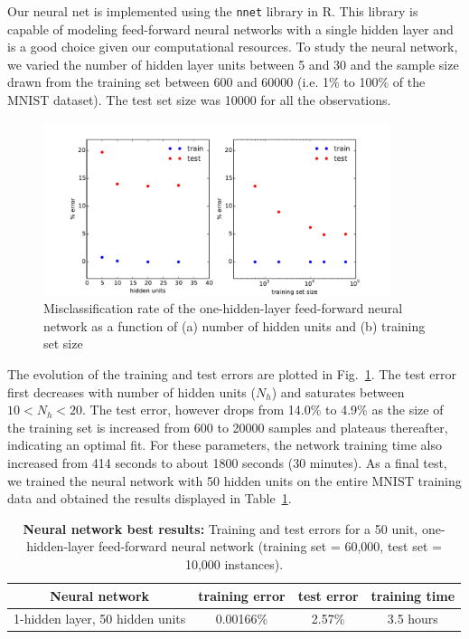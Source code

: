 \documentclass[10pt,letterpaper]{article}
\begin{document}
Our neural net is implemented using the {\tt nnet} library in R. This library is capable of modeling feed-forward neural networks with a single
hidden layer and is a good choice given our computational resources. To study the neural network, we varied the number of hidden layer units between 5 and 30 and the sample size drawn from the training set between 600 and 60000 (i.e. 1\% to 100\% of the MNIST dataset). The test set size was 10000 for all the observations.  
\begin{figure}[!tbp]
	\begin{center}
	\includegraphics[width=4in]{../results/mnist/nnet/error_vs_hidden_units_and_training_size.pdf}
	\end{center}
	\caption{Misclassification rate of the one-hidden-layer feed-forward neural network as a function of (a) number of hidden units and (b) training set size \label{nnet1}}
\end{figure}

The evolution of the training and test errors are plotted in Fig.~\ref{nnet1}. The test error first decreases with number of hidden units ($N_h$) and saturates between $10 < N_h < 20$. The test error, however drops from 14.0\% to 4.9\% as the size of the training set is increased from 600 to 20000 samples and plateaus thereafter, indicating an optimal fit. For these parameters, the network training time also increased from 414 seconds to about 1800 seconds (30 minutes). As a final test, we trained the neural network with 50 hidden units on the entire MNIST training data and obtained the results displayed in Table~\ref{tab2}.  
\begin{table}[tbp]
	\caption{{\bf Neural network best results:} Training and test errors for a 50 unit, one-hidden-layer feed-forward neural network (training set = 60,000, test set = 10,000 instances).\label{tab2}}
	\centering
    \begin{tabular}{c|c|c|c}
         \hline
            	{\bf Neural network}&{\bf training error} & {\bf test error} & {\bf training time}\\ \hline \hline
            	1-hidden layer, 50 hidden units&0.00166\%&2.57\% & 3.5 hours\\ \hline
    \end{tabular}
\end{table}
\end{document}
